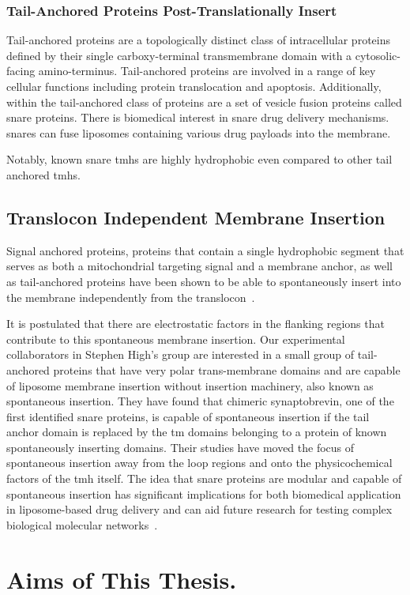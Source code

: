 \subsubsection{Tail-Anchored Proteins Post-Translationally Insert}

Tail-anchored proteins are a topologically distinct class of intracellular proteins defined by their single carboxy-terminal transmembrane domain with a cytosolic-facing amino-terminus.
Tail-anchored proteins are involved in a range of key cellular functions including protein translocation and apoptosis.
Additionally, within the tail-anchored class of proteins are a set of vesicle fusion proteins called \gls{snare} proteins.
There is biomedical interest in \gls{snare} drug delivery mechanisms.
\gls{snare}s can fuse liposomes containing various drug payloads into the membrane.

Notably, known \gls{snare} \gls{tmh}s are highly hydrophobic even compared to other tail anchored \gls{tmh}s.

\subsection{Translocon Independent Membrane Insertion}
Signal anchored proteins, proteins that contain a single hydrophobic segment that serves as both a mitochondrial targeting signal and a membrane anchor, as well as tail-anchored proteins have been shown to be able to spontaneously insert into the membrane independently from the translocon~\cite{Elisa2012, Lan2000, Colombo2009}.

It is postulated that there are electrostatic factors in the flanking regions that contribute to this spontaneous membrane insertion.
Our experimental collaborators in Stephen High’s group are interested in a small group of tail-anchored proteins that have very polar trans-membrane domains and are capable of liposome membrane insertion without insertion machinery, also known as spontaneous insertion.
They have found that chimeric synaptobrevin, one of the first identified \gls{snare} proteins, is capable of spontaneous insertion if the tail anchor domain is replaced by the \gls{tm} domains belonging to a protein of known spontaneously inserting domains.
Their studies have moved the focus of spontaneous insertion away from the loop regions and onto the physicochemical factors of the \gls{tmh} itself.
The idea that \gls{snare} proteins are modular and capable of spontaneous insertion has significant implications for both biomedical application in liposome-based drug delivery and can aid future research for testing complex biological molecular networks~\cite{Allen2013, Nordlund2014}.


\section{Aims of This Thesis.}
